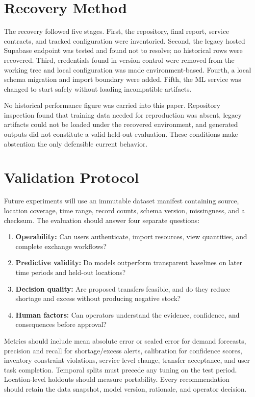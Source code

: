 \documentclass[graybox]{svmult}
\begin{document}
\section{Recovery Method}
The recovery followed five stages. First, the repository, final report, service contracts, and tracked configuration were inventoried. Second, the legacy hosted Supabase endpoint was tested and found not to resolve; no historical rows were recovered. Third, credentials found in version control were removed from the working tree and local configuration was made environment-based. Fourth, a local schema migration and import boundary were added. Fifth, the ML service was changed to start safely without loading incompatible artifacts.

No historical performance figure was carried into this paper. Repository inspection found that training data needed for reproduction was absent, legacy artifacts could not be loaded under the recovered environment, and generated outputs did not constitute a valid held-out evaluation. These conditions make abstention the only defensible current behavior.

\section{Validation Protocol}
Future experiments will use an immutable dataset manifest containing source, location coverage, time range, record counts, schema version, missingness, and a checksum. The evaluation should answer four separate questions:
\begin{enumerate}
\item \textbf{Operability:} Can users authenticate, import resources, view quantities, and complete exchange workflows?
\item \textbf{Predictive validity:} Do models outperform transparent baselines on later time periods and held-out locations?
\item \textbf{Decision quality:} Are proposed transfers feasible, and do they reduce shortage and excess without producing negative stock?
\item \textbf{Human factors:} Can operators understand the evidence, confidence, and consequences before approval?
\end{enumerate}

Metrics should include mean absolute error or scaled error for demand forecasts, precision and recall for shortage/excess alerts, calibration for confidence scores, inventory constraint violations, service-level change, transfer acceptance, and user task completion. Temporal splits must precede any tuning on the test period. Location-level holdouts should measure portability. Every recommendation should retain the data snapshot, model version, rationale, and operator decision.
\end{document}
